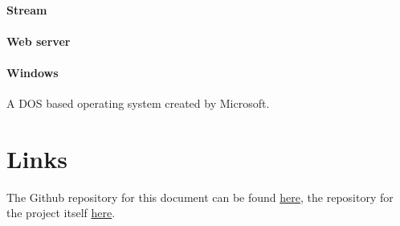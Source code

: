 \paragraph{Stream}

\paragraph{Web server}

\paragraph{Windows}
A DOS based operating system created by Microsoft.

\section{Links}

The Github repository for this document can be found \href{https://github.com/rootjs/specifications}{here}, the repository for the project itself \href{https://github.com/rootjs/rootjs}{here}.
